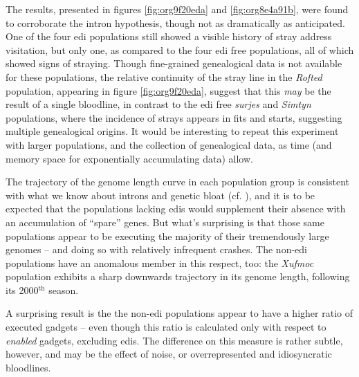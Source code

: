 \documentclass[12pt,glossary]{dalthesis}
\begin{document}
The results, presented in figures \ref{fig:org9f20eda} and
\ref{fig:org8e4a91b}, were found to corroborate the intron hypothesis,
though not as dramatically as anticipated. One of the four \gls{edi} populations
still showed a visible history of stray address visitation, but only one, as
compared to the four \gls{edi} free populations, all of which showed signs of
straying. Though fine-grained genealogical data is not available for these
populations, the relative continuity of the stray line in the \emph{Rofted} population, 
appearing in figure \ref{fig:org9f20eda}, suggest that this \emph{may} be the
result of a single bloodline, in contrast to the \gls{edi} free \emph{surjes} and 
\emph{Simtyn} populations, where the incidence of strays appears in fits and starts, 
suggesting multiple genealogical origins. It would be interesting to repeat this
experiment with larger populations, and the collection of genealogical data, 
as time (and memory space for exponentially accumulating data) allow. 

The trajectory of the genome length curve in each population group is consistent
with what we know about introns and genetic bloat (cf. \cite{banzhaf98}), and
it is to be expected that the populations lacking \glspl{edi} would supplement
their absence with an accumulation of ``spare'' genes. But what's surprising is
that those same populations appear to be executing the majority of their
tremendously large genomes -- and doing so with relatively infrequent crashes. 
The non-\gls{edi} populations have an anomalous member in this respect, too:
the \emph{Xufmoc} population exhibits a sharp downwards trajectory in its genome
length, following its 2000\(^{\text{th}}\) season.  

A surprising result is the the non-\gls{edi} populations appear to have a higher
ratio of executed gadgets -- even though this ratio is calculated only with respect
to \emph{enabled} gadgets, excluding \glspl{edi}. The difference on this measure is rather
subtle, however, and may be the effect of noise, or overrepresented and idiosyncratic
bloodlines. 
\end{document}
